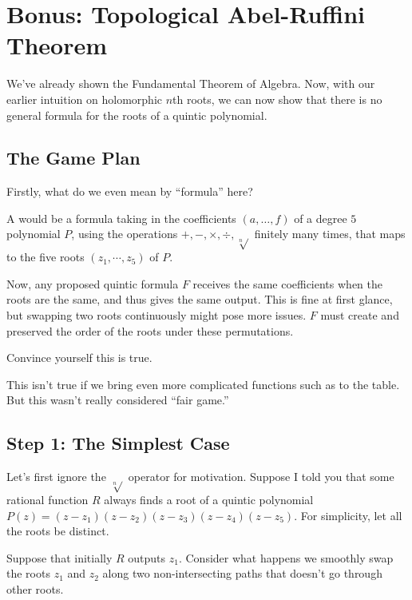 \chapter{Bonus: Topological Abel-Ruffini Theorem}
We've already shown the Fundamental Theorem of Algebra.
Now, with our earlier intuition on holomorphic $n$th roots,
we can now show that there is no general formula for
the roots of a quintic polynomial.

\section{The Game Plan}
Firstly, what do we even mean by ``formula'' here?

\begin{definition}
	A  would be a formula taking in the coefficients $(a, \dots, f)$ of a
	degree $5$ polynomial $P$, using the operations $+, -, \times, \div, \sqrt[n]{}$
	finitely many times, that maps to the five roots $(z_1, \cdots, z_5)$ of $P$.
\end{definition}

Now, any proposed quintic formula $F$ receives the same coefficients when the roots are the same,
and thus gives the same output. This is fine at first glance, but swapping two roots continuously
might pose more issues. $F$ must create and preserved the order of the roots under these permutations.

\begin{ques}
	Convince yourself this is true.
\end{ques}

\begin{remark}
	This isn't true if we bring even more complicated functions
	such as  to the table.
	But this wasn't really considered ``fair game.''
\end{remark}

\section{Step 1: The Simplest Case}
Let's first ignore the $\sqrt[n]{}$ operator for motivation.
Suppose I told you that some rational function $R$ always finds
a root of a quintic polynomial $P(z) = (z - z_1)(z - z_2)(z - z_3)(z - z_4)(z - z_5)$.
For simplicity, let all the roots be distinct.

Suppose that initially $R$ outputs $z_1$. Consider what happens we smoothly swap the roots $z_1$ and $z_2$
along two non-intersecting paths that doesn't go through other roots.

